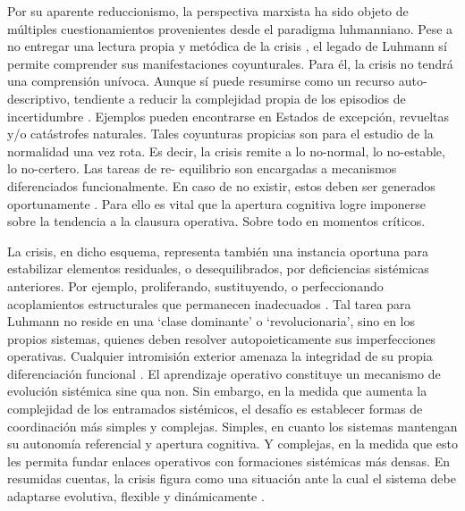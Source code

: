 \documentclass{textolivre}
\begin{document}
Por su aparente reduccionismo, la perspectiva marxista ha sido objeto de múltiples
cuestionamientos provenientes desde el paradigma luhmanniano. Pese a no entregar una
lectura propia y metódica de la crisis \cite{Mascareo2018}, el legado de Luhmann sí
permite comprender sus manifestaciones coyunturales. Para él, la crisis no tendrá una
comprensión unívoca. Aunque sí puede resumirse como un recurso auto-descriptivo,
tendiente a reducir la complejidad propia de los episodios de incertidumbre \cite{Luhmann1984}.
Ejemplos pueden encontrarse en Estados de excepción, revueltas y/o catástrofes
naturales. Tales coyunturas propicias son para el estudio de la normalidad una vez rota.
Es decir, la crisis remite a lo no-normal, lo no-estable, lo no-certero. Las tareas de re-
equilibrio son encargadas a mecanismos diferenciados funcionalmente. En caso de no
existir, estos deben ser generados oportunamente \cite{Luhmann1991}. Para ello es vital
que la apertura cognitiva logre imponerse sobre la tendencia a la clausura operativa.
Sobre todo en momentos críticos.

La crisis, en dicho esquema, representa también una instancia oportuna para
estabilizar elementos residuales, o desequilibrados, por deficiencias sistémicas anteriores.
Por ejemplo, proliferando, sustituyendo, o perfeccionando acoplamientos estructurales
que permanecen inadecuados \cite{teubner2012}. Tal tarea para Luhmann no reside en
una ‘clase dominante’ o ‘revolucionaria’, sino en los propios sistemas, quienes deben
resolver autopoieticamente sus imperfecciones operativas. Cualquier intromisión exterior
amenaza la integridad de su propia diferenciación funcional \cite{Tkke2010}.
El aprendizaje operativo constituye un mecanismo de evolución sistémica sine qua non.
Sin embargo, en la medida que aumenta la complejidad de los entramados sistémicos, el
desafío es establecer formas de coordinación más simples y complejas. Simples, en
cuanto los sistemas mantengan su autonomía referencial y apertura cognitiva. Y
complejas, en la medida que esto les permita fundar enlaces operativos con formaciones
sistémicas más densas. En resumidas cuentas, la crisis figura como una situación ante la
cual el sistema debe adaptarse evolutiva, flexible y dinámicamente \cite{Folke2016}.
\end{document}
